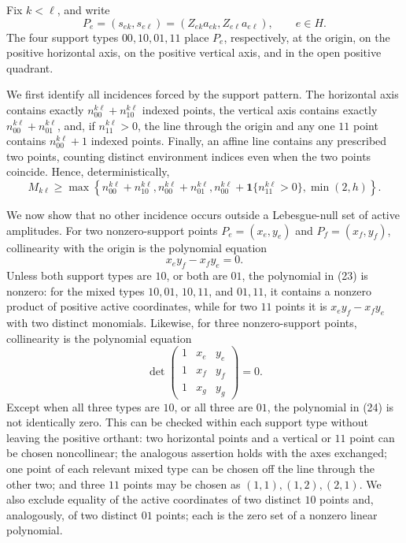 Fix \(k<\ell\), and write
\[
 P_e=(s_{ek},s_{e\ell})=(Z_{ek}a_{ek},Z_{e\ell}a_{e\ell}),\qquad e\in H.
\]
The four support types \(00,10,01,11\) place \(P_e\), respectively, at the origin, on the positive horizontal axis, on the positive vertical axis, and in the open positive quadrant.

We first identify all incidences forced by the support pattern.  The horizontal axis contains exactly \(n_{00}^{k\ell}+n_{10}^{k\ell}\) indexed points, the vertical axis contains exactly \(n_{00}^{k\ell}+n_{01}^{k\ell}\), and, if \(n_{11}^{k\ell}>0\), the line through the origin and any one \(11\) point contains \(n_{00}^{k\ell}+1\) indexed points.  Finally, an affine line contains any prescribed two points, counting distinct environment indices even when the two points coincide.  Hence, deterministically,
\[
 M_{k\ell}\ge
 \max\!\left\{
 n_{00}^{k\ell}+n_{10}^{k\ell},
 n_{00}^{k\ell}+n_{01}^{k\ell},
 n_{00}^{k\ell}+\mathbf 1\{n_{11}^{k\ell}>0\},
 \min(2,h)
 \right\}. \tag{22}
\]

We now show that no other incidence occurs outside a Lebesgue-null set of active amplitudes.  For two nonzero-support points \(P_e=(x_e,y_e)\) and \(P_f=(x_f,y_f)\), collinearity with the origin is the polynomial equation
\[
 x_ey_f-x_fy_e=0. \tag{23}
\]
Unless both support types are \(10\), or both are \(01\), the polynomial in (23) is nonzero: for the mixed types \(10,01\), \(10,11\), and \(01,11\), it contains a nonzero product of positive active coordinates, while for two \(11\) points it is \(x_ey_f-x_fy_e\) with two distinct monomials.  Likewise, for three nonzero-support points, collinearity is the polynomial equation
\[
 \det\begin{pmatrix}
 1&x_e&y_e\\1&x_f&y_f\\1&x_g&y_g
 \end{pmatrix}=0. \tag{24}
\]
Except when all three types are \(10\), or all three are \(01\), the polynomial in (24) is not identically zero.  This can be checked within each support type without leaving the positive orthant: two horizontal points and a vertical or \(11\) point can be chosen noncollinear; the analogous assertion holds with the axes exchanged; one point of each relevant mixed type can be chosen off the line through the other two; and three \(11\) points may be chosen as \((1,1),(1,2),(2,1)\).  We also exclude equality of the active coordinates of two distinct \(10\) points and, analogously, of two distinct \(01\) points; each is the zero set of a nonzero linear polynomial.

